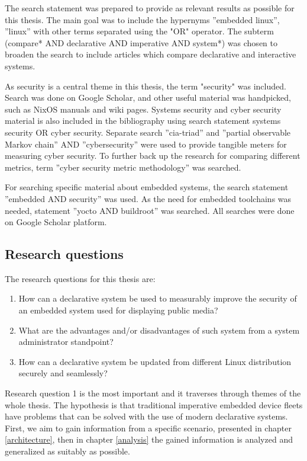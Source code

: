 The search statement was prepared to provide as relevant results as
possible for this thesis. The main goal was to include the hypernyms
''embedded linux'', ''linux'' with other terms separated using the
"OR" operator. The subterm (compare* AND declarative AND imperative
AND system*) was chosen to broaden the search to include articles
which compare declarative and interactive systems.

As security is a central theme in this thesis, the term "security" was
included. Search was done on Google Scholar, and other useful material
was handpicked, such as NixOS manuals and wiki pages. Systems security
and cyber security material is also included in the bibliography using
search statement systems security OR cyber security. Separate search
''cia-triad'' and ''partial observable Markov chain'' AND
''cybersecurity'' were used to provide tangible meters for
measuring cyber security. To further back up the research for
comparing different metrics, term ''cyber security metric
methodology'' was searched.

For searching specific material about embedded systems, the search
statement ''embedded AND security'' was used. As the need for embedded
toolchains was needed, statement ''yocto AND buildroot'' was
searched. All searches were done on Google Scholar platform.

\subsection{Research questions} \label{resquest}

The research questions for this thesis are:

\begin{enumerate}
\item How can a declarative system be used to measurably improve the security of an embedded system used for displaying public media?
\item What are the advantages and/or disadvantages of such system from
 a system administrator standpoint?
\item How can a declarative system be updated from different Linux
  distribution securely and seamlessly?
\end{enumerate}

Research question 1 is the most important and it traverses
through themes of the whole thesis. The hypothesis is that traditional
imperative embedded device fleets have problems that can be solved
with the use of modern declarative systems. First, we aim to gain
information from a specific scenario, presented in chapter
\ref{architecture}, then in chapter \ref{analysis} the gained
information is analyzed and generalized as suitably as possible. 

